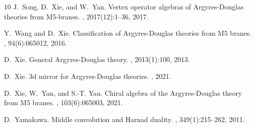 \documentclass[11pt,a4paper]{amsart}
\numberwithin{equation}{section}
\begin{document}
\begin{thebibliography}{10}
J.~Song, D.~Xie, and W.~Yan.
\newblock Vertex operator algebras of {A}rgyres-{D}ouglas theories from
  {M5}-branes.
, 2017(12):1--36, 2017.

Y.~Wang and D.~Xie.
\newblock Classification of {A}rgyres-{D}ouglas theories from {M5} branes.
, 94(6):065012, 2016.

D.~Xie.
\newblock General {A}rgyres-{D}ouglas theory.
, 2013(1):100, 2013.

D.~Xie.
\newblock 3d mirror for {A}rgyres-{D}ouglas theories.
, 2021.

D.~Xie, W.~Yan, and S.-T. Yau.
\newblock Chiral algebra of the {A}rgyres-{D}ouglas theory from {M5} branes.
, 103(6):065003, 2021.

D.~Yamakawa.
\newblock Middle convolution and {Harnad} duality.
, 349(1):215--262, 2011.

\end{thebibliography}
\end{document}
